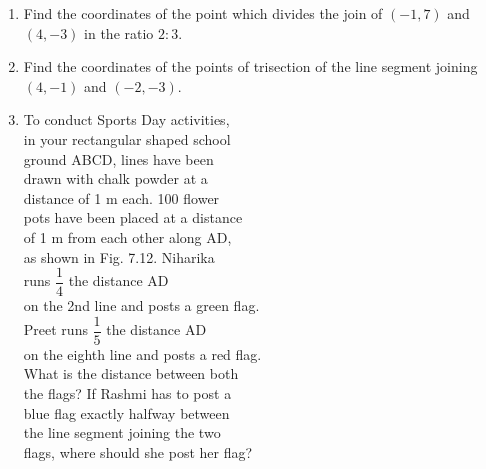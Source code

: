 \documentclass[a4paper,12pt]{article}
\begin{document}
\begin{enumerate}[leftmargin=*]                                                    \item Find the coordinates of the point which divides the join of $(-1, 7)$ and $(4
, -3)$ in the ratio $2 : 3$.                                                       
\item Find the coordinates of the points of trisection of the line segment joining $(4, -1)$ and $(-2, -3)$.
                                                                                   \item
\begin{minipage}{0.55\textwidth}                                                   To conduct Sports Day activities,\\                                                in your rectangular shaped school\\                                                ground ABCD, lines have been\\
drawn with chalk powder at a\\
distance of 1 m each. 100 flower\\                                                 pots have been placed at a distance\\
of 1 m from each other along AD,\\
as shown in Fig. 7.12. Niharika\\
runs $\dfrac{1}{4}$ the distance AD\\                                              on the 2nd line and posts a green flag.\\                                          Preet runs $\dfrac{1}{5}$ the distance AD\\                                        on the eighth line and posts a red flag.\\                                         What is the distance between both\\
the flags? If Rashmi has to post a\\                                               blue flag exactly halfway between\\                                                the line segment joining the two\\
flags, where should she post her flag?                                             \end{minipage}%

\end{enumerate}
\end{document}
